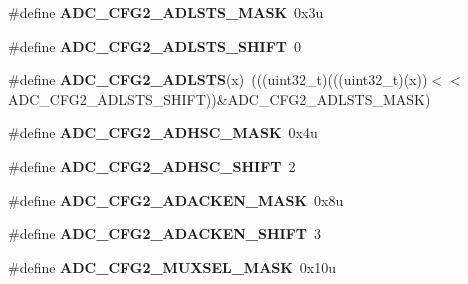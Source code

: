 \begin{DoxyCompactItemize}
\item 
\#define {\bfseries A\+D\+C\+\_\+\+C\+F\+G2\+\_\+\+A\+D\+L\+S\+T\+S\+\_\+\+M\+A\+SK}~0x3u\hypertarget{group__ADC__Register__Masks_ga99f0b4983922eca1e6ed86d053fe41db}{}\label{group__ADC__Register__Masks_ga99f0b4983922eca1e6ed86d053fe41db}

\item 
\#define {\bfseries A\+D\+C\+\_\+\+C\+F\+G2\+\_\+\+A\+D\+L\+S\+T\+S\+\_\+\+S\+H\+I\+FT}~0\hypertarget{group__ADC__Register__Masks_ga8d39dceb9fa2550294f0623cc1fbc3f3}{}\label{group__ADC__Register__Masks_ga8d39dceb9fa2550294f0623cc1fbc3f3}

\item 
\#define {\bfseries A\+D\+C\+\_\+\+C\+F\+G2\+\_\+\+A\+D\+L\+S\+TS}(x)~(((uint32\+\_\+t)(((uint32\+\_\+t)(x))$<$$<$A\+D\+C\+\_\+\+C\+F\+G2\+\_\+\+A\+D\+L\+S\+T\+S\+\_\+\+S\+H\+I\+FT))\&A\+D\+C\+\_\+\+C\+F\+G2\+\_\+\+A\+D\+L\+S\+T\+S\+\_\+\+M\+A\+SK)\hypertarget{group__ADC__Register__Masks_gae23653c06f0dfe00b27a15ef15138c8e}{}\label{group__ADC__Register__Masks_gae23653c06f0dfe00b27a15ef15138c8e}

\item 
\#define {\bfseries A\+D\+C\+\_\+\+C\+F\+G2\+\_\+\+A\+D\+H\+S\+C\+\_\+\+M\+A\+SK}~0x4u\hypertarget{group__ADC__Register__Masks_ga73cb928c5cacb18e02a3f0d67dcf1e6f}{}\label{group__ADC__Register__Masks_ga73cb928c5cacb18e02a3f0d67dcf1e6f}

\item 
\#define {\bfseries A\+D\+C\+\_\+\+C\+F\+G2\+\_\+\+A\+D\+H\+S\+C\+\_\+\+S\+H\+I\+FT}~2\hypertarget{group__ADC__Register__Masks_ga447389268d77124eb2012fd98bfe07ce}{}\label{group__ADC__Register__Masks_ga447389268d77124eb2012fd98bfe07ce}

\item 
\#define {\bfseries A\+D\+C\+\_\+\+C\+F\+G2\+\_\+\+A\+D\+A\+C\+K\+E\+N\+\_\+\+M\+A\+SK}~0x8u\hypertarget{group__ADC__Register__Masks_ga1158034a83b78e238c3f8ca481ab9b27}{}\label{group__ADC__Register__Masks_ga1158034a83b78e238c3f8ca481ab9b27}

\item 
\#define {\bfseries A\+D\+C\+\_\+\+C\+F\+G2\+\_\+\+A\+D\+A\+C\+K\+E\+N\+\_\+\+S\+H\+I\+FT}~3\hypertarget{group__ADC__Register__Masks_gad009e6fe93b9f44fb0f79cd479d8bb1a}{}\label{group__ADC__Register__Masks_gad009e6fe93b9f44fb0f79cd479d8bb1a}

\item 
\#define {\bfseries A\+D\+C\+\_\+\+C\+F\+G2\+\_\+\+M\+U\+X\+S\+E\+L\+\_\+\+M\+A\+SK}~0x10u\hypertarget{group__ADC__Register__Masks_ga5c50199c9b27cb92554a647909c6338a}{}\label{group__ADC__Register__Masks_ga5c50199c9b27cb92554a647909c6338a}


\end{DoxyCompactItemize}
